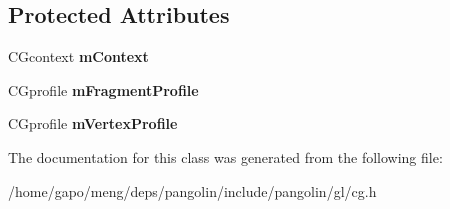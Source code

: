\subsection*{Protected Attributes}
\begin{DoxyCompactItemize}
\item 
C\+Gcontext {\bfseries m\+Context}\hypertarget{classpangolin_1_1_cg_loader_a3c54d797489644ded7c972ed86729b56}{}\label{classpangolin_1_1_cg_loader_a3c54d797489644ded7c972ed86729b56}

\item 
C\+Gprofile {\bfseries m\+Fragment\+Profile}\hypertarget{classpangolin_1_1_cg_loader_af1e35088663265366c0c5e0d9fcd44a1}{}\label{classpangolin_1_1_cg_loader_af1e35088663265366c0c5e0d9fcd44a1}

\item 
C\+Gprofile {\bfseries m\+Vertex\+Profile}\hypertarget{classpangolin_1_1_cg_loader_ab5510b2ae2a929f107b9111f2b5357fb}{}\label{classpangolin_1_1_cg_loader_ab5510b2ae2a929f107b9111f2b5357fb}

\end{DoxyCompactItemize}


The documentation for this class was generated from the following file\+:\begin{DoxyCompactItemize}
\item 
/home/gapo/meng/deps/pangolin/include/pangolin/gl/cg.\+h\end{DoxyCompactItemize}
